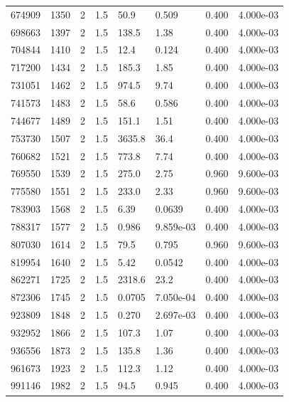 \documentclass[preview]{standalone}
\begin{document}
{{{{{{{{{{{{{{{\begin{tabular}{L{1.2cm}C{1.2cm} C{0.3cm}C{0.5cm} C{1.4cm}C{1.4cm} C{1.4cm}C{1.4cm}}
  674909  &  1350  & 2     & 1.5 &  50.9  & 0.509  & 0.400 &  4.000e-03   \\ 
  698663  &  1397  & 2     & 1.5 &  138.5  & 1.38  & 0.400 &  4.000e-03   \\ 
  704844  &  1410  & 2     & 1.5 &  12.4  & 0.124  & 0.400 &  4.000e-03   \\ 
  717200  &  1434  & 2     & 1.5 &  185.3  & 1.85  & 0.400 &  4.000e-03   \\ 
  731051  &  1462  & 2     & 1.5 &  974.5  & 9.74  & 0.400 &  4.000e-03   \\ 
  741573  &  1483  & 2     & 1.5 &  58.6  & 0.586  & 0.400 &  4.000e-03   \\ 
  744677  &  1489  & 2     & 1.5 &  151.1  & 1.51  & 0.400 &  4.000e-03   \\ 
  753730  &  1507  & 2     & 1.5 &  3635.8  & 36.4  & 0.400 &  4.000e-03   \\ 
  760682  &  1521  & 2     & 1.5 &  773.8  & 7.74  & 0.400 &  4.000e-03   \\ 
  769550  &  1539  & 2     & 1.5 &  275.0  & 2.75  & 0.960 &  9.600e-03   \\ 
  775580  &  1551  & 2     & 1.5 &  233.0  & 2.33  & 0.960 &  9.600e-03   \\ 
  783903  &  1568  & 2     & 1.5 &  6.39  & 0.0639  & 0.400 &  4.000e-03   \\ 
  788317  &  1577  & 2     & 1.5 &  0.986  & 9.859e-03  & 0.400 &  4.000e-03   \\ 
  807030  &  1614  & 2     & 1.5 &  79.5  & 0.795  & 0.960 &  9.600e-03   \\ 
  819954  &  1640  & 2     & 1.5 &  5.42  & 0.0542  & 0.400 &  4.000e-03   \\ 
  862271  &  1725  & 2     & 1.5 &  2318.6  & 23.2  & 0.400 &  4.000e-03   \\ 
  872306  &  1745  & 2     & 1.5 &  0.0705  & 7.050e-04  & 0.400 &  4.000e-03   \\ 
  923809  &  1848  & 2     & 1.5 &  0.270  & 2.697e-03  & 0.400 &  4.000e-03   \\ 
  932952  &  1866  & 2     & 1.5 &  107.3  & 1.07  & 0.400 &  4.000e-03   \\ 
  936556  &  1873  & 2     & 1.5 &  135.8  & 1.36  & 0.400 &  4.000e-03   \\ 
  961673  &  1923  & 2     & 1.5 &  112.3  & 1.12  & 0.400 &  4.000e-03   \\ 
  991146  &  1982  & 2     & 1.5 &  94.5  & 0.945  & 0.400 &  4.000e-03   \\ 

\end{tabular}}}}}}}}}}}}}}}}
\end{document}
